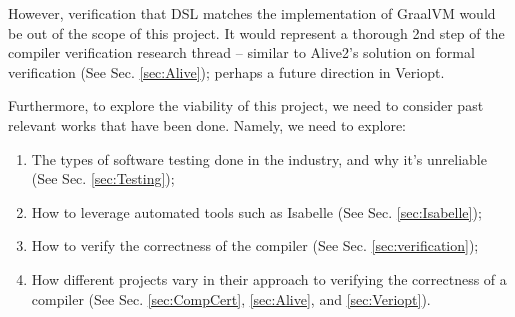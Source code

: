 However, verification that DSL matches the implementation of GraalVM would be out of the scope of this project. It would represent a thorough 
2nd step of the compiler verification research thread \cite[pp. 5]{CompilerOptimization} -- similar to Alive2's \cite{Alive2} solution on formal 
verification (See Sec. \ref{sec:Alive}); perhaps a future direction in Veriopt.

Furthermore, to explore the viability of this project, we need to consider past relevant works that have been done. Namely, we need to explore:

\begin{enumerate}
    \item The types of software testing done in the industry, and why it's unreliable (See Sec. \ref{sec:Testing});
    \item How to leverage automated tools such as Isabelle (See Sec. \ref{sec:Isabelle});
    \item How to verify the correctness of the compiler (See Sec. \ref{sec:verification});
    \item How different projects vary in their approach to verifying the correctness of a compiler (See Sec. \ref{sec:CompCert}, 
          \ref{sec:Alive}, and \ref{sec:Veriopt}).
\end{enumerate}